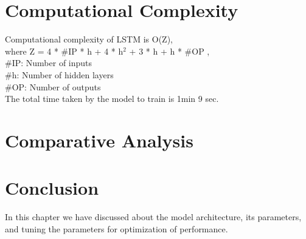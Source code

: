 \section{Computational Complexity}

Computational complexity of LSTM is O(Z),\\
  where Z = 4 * \#IP * h + 4 * h$^{2}$ + 3 * h + h * \#OP , \\
 \tab\#IP: Number of inputs\\
 \tab\#h: Number of hidden layers\\
 \tab\#OP: Number of outputs\\

The total time taken by the model to train is 1min 9 sec.
\section{Comparative Analysis} 


\section{Conclusion }

In this chapter we have discussed about the model architecture, its parameters, and tuning the parameters for optimization of performance.
